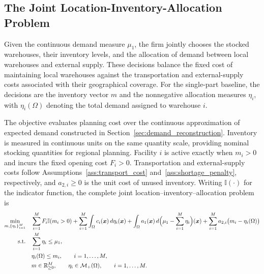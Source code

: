 \documentclass[a4paper,fleqn]{cas-sc}
\theoremstyle{remark}
\theoremstyle{plain}
\begin{document}
\subsection{The Joint Location-Inventory-Allocation Problem}\label{sec:JLIA_modeling}

Given the continuous demand measure $\mu_1$, the firm jointly chooses the stocked warehouses, their inventory levels, and the allocation of demand between local warehouses and external supply. These decisions balance the fixed cost of maintaining local warehouses against the transportation and external-supply costs associated with their geographical coverage. For the single-part baseline, the decisions are the inventory vector $m$ and the nonnegative allocation measures $\eta_i$, with $\eta_i(\Omega)$ denoting the total demand assigned to warehouse $i$.

The objective evaluates planning cost over the continuous approximation of expected demand constructed in Section~\ref{sec:demand_reconstruction}. Inventory is measured in continuous units on the same quantity scale, providing nominal stocking quantities for regional planning. Facility $i$ is active exactly when $m_i>0$ and incurs the fixed opening cost $F_i>0$. Transportation and external-supply costs follow Assumptions~\ref{ass:transport_cost} and~\ref{ass:shortage_penalty}, respectively, and $a_{2,i}\ge0$ is the unit cost of unused inventory. Writing $\mathbb I(\cdot)$ for the indicator function, the complete joint location--inventory--allocation problem is
\begin{subequations}\label{eq:jlia-full}
\allowdisplaybreaks[0]
\begin{align}
    \min_{m,\{\eta_i\}_{i=1}^M}\quad
       &\sum_{i=1}^M F_i\mathbb I(m_i>0)
        +\sum_{i=1}^M\int_\Omega c_i(\bm x)\,d\eta_i(\bm x)
        +\int_\Omega a_1(\bm x)\,d\Bigl(\mu_1-\sum_{i=1}^M\eta_i\Bigr)(\bm x)
        +\sum_{i=1}^M a_{2,i}\bigl(m_i-\eta_i(\Omega)\bigr)
        \label{eq:jlia-objective}\\
    \text{s.t.}\quad
       &\sum_{i=1}^M\eta_i\le\mu_1,
        \label{eq:jlia-demand}\\
       &\eta_i(\Omega)\le m_i,\qquad i=1,\ldots,M,
        \label{eq:jlia-stock}\\
       &m\in\mathbb R_{\ge0}^M,\qquad
        \eta_i\in\mathcal M_+(\Omega),\qquad i=1,\ldots,M.
        \label{eq:jlia-domains}
\end{align}
\end{subequations}
\end{document}
